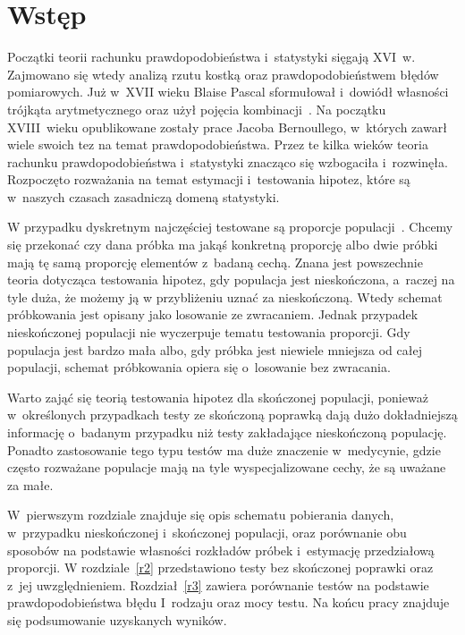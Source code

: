\chapter*{Wstęp}
Początki teorii rachunku prawdopodobieństwa i~statystyki sięgają XVI~w. Zajmowano się wtedy analizą rzutu kostką oraz prawdopodobieństwem błędów pomiarowych. Już w~XVII wieku Blaise Pascal sformułował i~dowiódł własności trójkąta arytmetycznego oraz użył pojęcia kombinacji~\cite{Hald2003}. Na początku XVIII~wieku opublikowane zostały prace Jacoba Bernoullego, w~których zawarł wiele swoich tez na temat prawdopodobieństwa. Przez te kilka wieków teoria rachunku prawdopodobieństwa i~statystyki znacząco się wzbogaciła i~rozwinęła. Rozpoczęto rozważania na temat estymacji i~testowania hipotez, które są w~naszych czasach zasadniczą domeną statystyki.

W przypadku dyskretnym najczęściej testowane są proporcje populacji~\cite{Lehmann1968}. Chcemy się przekonać czy dana próbka ma jakąś konkretną proporcję albo dwie próbki mają tę samą proporcję elementów z~badaną cechą. Znana jest powszechnie teoria dotycząca testowania hipotez, gdy populacja jest nieskończona, a~raczej na tyle duża, że możemy ją w przybliżeniu uznać za nieskończoną. Wtedy schemat próbkowania jest opisany jako losowanie ze zwracaniem. Jednak przypadek nieskończonej populacji nie wyczerpuje tematu testowania proporcji. Gdy populacja jest bardzo mała albo, gdy próbka jest niewiele mniejsza od całej populacji, schemat próbkowania opiera się o~losowanie bez zwracania. 

Warto zająć się teorią testowania hipotez dla skończonej populacji, ponieważ w~określonych przypadkach testy ze skończoną poprawką dają dużo dokładniejszą informację o~badanym przypadku niż testy zakładające nieskończoną populację. Ponadto zastosowanie tego typu testów ma duże znaczenie w~medycynie, gdzie często rozważane populacje mają na tyle wyspecjalizowane cechy, że są uważane za małe.

W~pierwszym rozdziale znajduje się opis schematu pobierania danych, w~przypadku nieskończonej i~skończonej populacji, oraz porównanie obu sposobów na podstawie własności rozkładów próbek i~estymację przedziałową proporcji. W rozdziale~\ref{r2} przedstawiono testy bez skończonej poprawki oraz z~jej uwzględnieniem. Rozdział~\ref{r3} zawiera porównanie testów na podstawie prawdopodobieństwa błędu I~rodzaju oraz mocy testu. Na końcu pracy znajduje się podsumowanie uzyskanych wyników.